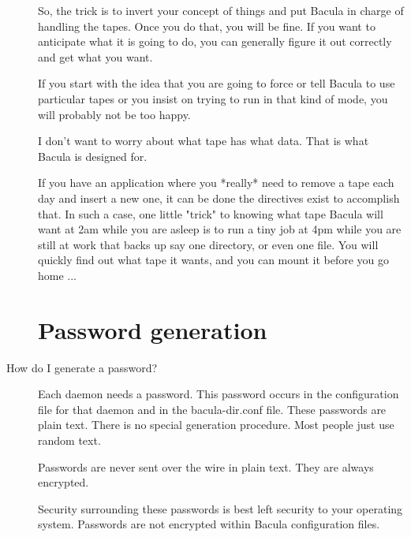 \begin{description}
  So, the trick is to invert your concept of things and put Bacula in charge of
  handling the tapes.  Once you do that, you will be fine.  If you want to
  anticipate what it is going to do, you can generally figure it out correctly
  and  get what you want.

  If you start with the idea that you are going to force or tell Bacula to use
  particular tapes or you insist on trying to run in that kind of mode, you will
  probably not be too happy.

  I don't want to worry about what tape has what data. That is what Bacula is
  designed for.

  If you have an application where you *really* need to remove a tape each day
  and  insert a new one, it can be done the directives exist to accomplish that.
  In such a case, one little "trick" to knowing what tape Bacula will want at
  2am  while you are asleep is to run a tiny job at 4pm while you are still at
  work  that backs up say one directory, or even one file. You will quickly find
  out  what tape it wants, and you can mount it before you go home ...

\label{Password generation}
\section{Password generation}
\item [How do I generate a password?]

   Each daemon needs a password.  This password occurs in the configuration
   file for that daemon and in the bacula-dir.conf file. These passwords are
   plain text.  There is no special generation procedure.  Most people just
   use random text.

   Passwords are never sent over the wire in plain text.  They are always
   encrypted.

   Security surrounding these passwords is best left security to your
   operating system.  Passwords are not encrypted within Bacula
   configuration files.

\end{description}
